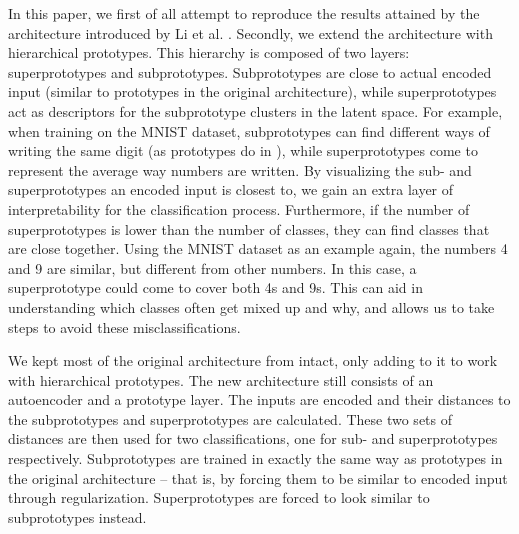In this paper, we first of all attempt to reproduce the results attained by the architecture introduced by Li et al. \citep{li2018deep}. Secondly, we extend the architecture with hierarchical prototypes. This hierarchy is composed of two layers: superprototypes and subprototypes. Subprototypes are close to actual encoded input (similar to prototypes in the original architecture), while superprototypes act as descriptors for the subprototype clusters in the latent space. For example, when training on the MNIST dataset, subprototypes can find different ways of writing the same digit (as prototypes do in \citep{li2018deep}), while superprototypes come to represent the average way numbers are written. By visualizing the sub- and superprototypes an encoded input is closest to, we gain an extra layer of interpretability for the classification process. Furthermore, if the number of superprototypes is lower than the number of classes, they can find classes that are close together. Using the MNIST dataset as an example again, the numbers 4 and 9 are similar, but different from other numbers. In this case, a superprototype could come to cover both 4s and 9s. This can aid in understanding which classes often get mixed up and why, and allows us to take steps to avoid these misclassifications.

We kept most of the original architecture from \citep{li2018deep} intact, only adding to it to work with hierarchical prototypes. The new architecture still consists of an autoencoder and a prototype layer. The inputs are encoded and their distances to the subprototypes and superprototypes are calculated. These two sets of distances are then used for two classifications, one for sub- and superprototypes respectively. Subprototypes are trained in exactly the same way as prototypes in the original architecture -- that is, by forcing them to be similar to encoded input through regularization. Superprototypes are forced to look similar to subprototypes instead.

